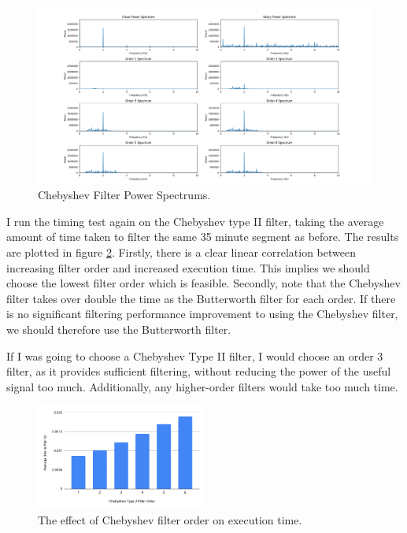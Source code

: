 \documentclass[12pt,a4paper,twoside,openright]{report}
\begin{document}
\begin{figure}
	\centering
	\includegraphics[width=\textwidth]{figs/cheby2-validity.png}
	\caption{Chebyshev Filter Power Spectrums.}
	\label{fig:cheby2-validity}
\end{figure}

I run the timing test again on the Chebyshev type II filter, taking the average amount
of time taken to filter the same 35 minute segment as before. The results are
plotted in figure \ref{fig:cheby2-time}. Firstly, there is a clear linear
correlation between increasing filter order and increased execution time. This
implies we should choose the lowest filter order which is feasible. Secondly,
note that the Chebyshev filter takes over double the time as the
Butterworth filter for each order. If there is no significant filtering
performance improvement to using the Chebyshev filter, we should therefore use the
Butterworth filter.

If I was going to choose a Chebyshev Type II filter, I would choose an order 3
filter, as it provides sufficient filtering, without reducing the power of the
useful signal too much. Additionally, any higher-order filters would take too
much time.

\begin{figure}[tbh]
	\centerline{\includegraphics[width=0.5\textwidth]{figs/cheby2-time.png}}
	\caption{The effect of Chebyshev filter order on execution time.}
	\label{fig:cheby2-time}
\end{figure}
\end{document}
